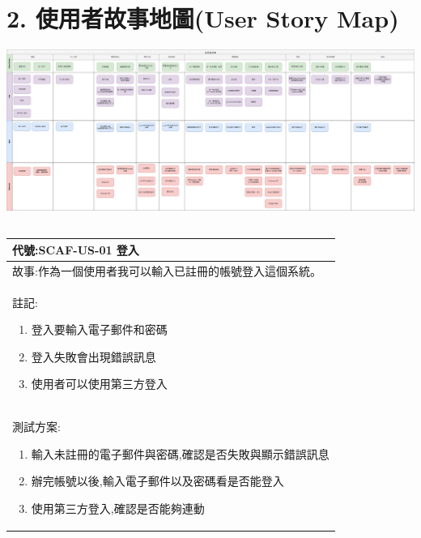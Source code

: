 \documentclass{report}
\begin{document}
\section*{2. 使用者故事地圖(User Story Map)}

\includegraphics[width=\textwidth]{assets/User_Story_Map.png}


\subsection*{}
\fontsize{12}{20}\selectfont
\begin{tabularx}{\textwidth}{|X|}
  \hline
  代號:SCAF-US-01 登入\\ \hline
  故事:作為一個使用者我可以輸入已註冊的帳號登入這個系統。 \\ \hline
  註記:
  \begin{enumerate}
    \item 登入要輸入電子郵件和密碼
    \item 登入失敗會出現錯誤訊息
    \item 使用者可以使用第三方登入 
  \end{enumerate} \\ \hline
  測試方案:
  \begin{enumerate}
    \item 輸入未註冊的電子郵件與密碼,確認是否失敗與顯示錯誤訊息
    \item 辦完帳號以後,輸入電子郵件以及密碼看是否能登入
    \item 使用第三方登入,確認是否能夠連動
  \end{enumerate} \\ \hline
\end{tabularx}
\end{document}

